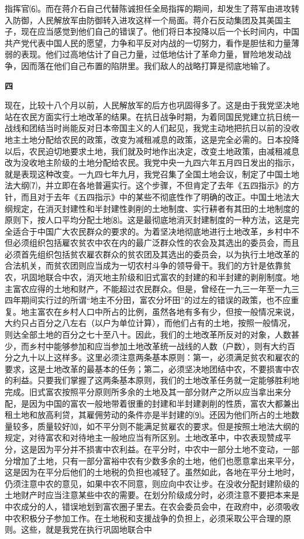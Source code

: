 \documentclass[UTF-8, a5paper, 12pt]{ctexart}
\begin{document}
指挥官⑹。而在蒋介石自己代替陈诚担任全局指挥的期间，却发生了蒋军由进攻转入防御，人民解放军由防御转入进攻这样一个局面。蒋介石反动集团及其美国主子，现在应当感觉到他们自己的错误了。他们将日本投降以后一个长时间内，中国共产党代表中国人民的愿望，力争和平反对内战的一切努力，看作是胆怯和力量薄弱的表现。他们过高地估计了自己力量，过低地估计了革命力量，冒险地发动战争，因而落在他们自己布置的陷阱里。我们敌人的战略打算是彻底地输了。

\textbf{四}

现在，比较十八个月以前，人民解放军的后方也巩固得多了。这是由于我党坚决地站在农民方面实行土地改革的结果。在抗日战争时期，为着同国民党建立抗日统一战线和团结当时尚能反对日本帝国主义的人们起见，我党主动地把抗日以前的没收地主土地分配给农民的政策，改变为减租减息的政策，这是完全必需的。日本投降以后，农民迫切地要求土地，我们就及时地作出决定，改变土地政策，由减租减息改为没收地主阶级的土地分配给农民。我党中央一九四六年五月四日发出的指示，就是表现这种改变。一九四七年九月，我党召集了全国土地会议，制定了中国土地法大纲⑺，并立即在各地普遍实行。这个步骤，不但肯定了去年《五四指示》的方针，而且对于去年《五四指示》中的某些不彻底性作了明确的改正。中国土地法大纲规定，在消灭封建性和半封建性剥削的土地制度、实行耕者有其田的土地制度的原则下，按人口平均分配土地⑻。这是最彻底地消灭封建制度的一种方法，这是完全适合于中国广大农民群众的要求的。为着坚决地彻底地进行土地改革，乡村中不但必须组织包括雇农贫农中农在内的最广泛群众性的农会及其选出的委员会，而且必须首先组织包括贫农雇农群众的贫农团及其选出的委员会，以为执行土地改革的合法机关，而贫农团则应当成为一切农村斗争的领导骨干。我们的方针是依靠贫农，巩固地联合中农，消灭地主阶级和旧式富农的封建的和半封建的剥削制度。地主富农应得的土地和财产，不能超过农民群众。但是，曾经在一九三一年至一九三四年期间实行过的所谓“地主不分田，富农分坏田”的过左的错误的政策，也不应重复。地主富农在乡村人口中所占的比例，虽然各地有多有少，但按一般情况来说，大约只占百分之八左右（以户为单位计算），而他们占有的土地，按照一般情况，则达全部土地的百分之七十至八十。因此，我们的土地改革所反对的对象，人数甚少，而乡村中能够参加和应当参加土地改革统一战线的人数（户数），则有大约百分之九十以上这样多。这里必须注意两条基本原则：第一，必须满足贫农和雇农的要求，这是土地改革的最基本的任务；第二，必须坚决地团结中农，不要损害中农的利益。只要我们掌握了这两条基本原则，我们的土地改革任务就一定能够胜利地完成。旧式富农按照平分原则所多余的土地及其一部分财产之所以应当拿出来分配，是因为中国的富农一般地带着很重的封建和半封建剥削的性质，富农大都兼出租土地和放高利贷，其雇佣劳动的条件亦是半封建的⑼。还因为他们所占的土地数量较多，质量较好⑽，如不平分则不能满足贫雇农的要求。但是按照土地法大纲的规定，对待富农和对待地主一般地应当有所区别。土地改革中，中农表现赞成平分，这是因为平分并不损害中农利益。在平分时，中农中一部分土地不变动，一部分增加了土地，只有一部分富裕中农有少数多余的土地，他们也愿意拿出来平分，这是因为在平分后他们的土地税的负担也减轻了。虽然如此，各地在平分土地时，仍须注意中农的意见，如果中农不同意，则应向中农让步。在没收分配封建阶级的土地财产时应当注意某些中农的需要。在划分阶级成分时，必须注意不要把本来是中农成分的人，错误地划到富农圈子里去。在农会委员会中，在政府中，必须吸收中农积极分子参加工作。在土地税和支援战争的负担上，必须采取公平合理的原则。这些，就是我党在执行巩固地联合中
\end{document}
